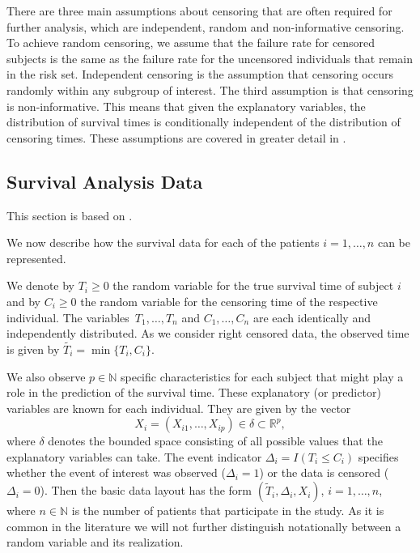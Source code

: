 \documentclass[12pt, a4paper]{scrartcl}
\theoremstyle{definition}
\theoremstyle{plain}
\numberwithin{equation}{section}
\numberwithin{figure}{section}
\numberwithin{table}{section}
\begin{document}
	There are three main assumptions about censoring that are often required for further analysis, which are independent, random and non-informative censoring.
	To achieve random censoring, we assume that the failure rate for censored subjects is the same as the failure rate for the uncensored individuals that remain in the risk set.
	Independent censoring is the assumption that censoring occurs randomly within any subgroup of interest.
	The third assumption is that censoring is non-informative.
	This means that given the explanatory variables, the distribution of survival times is conditionally independent of the distribution of censoring times.
	These assumptions are covered in greater detail in \citet*{bookfailuretime}.
	
	
	\subsection{Survival Analysis Data} \label{sabasics}
	
	This section is based on \citet*{sabook}.
	
	We now describe how the survival data for each of the patients $i = 1, \dots, n$ can be represented.
	
	We denote by $T_i \geq 0$ the random variable for the true survival time of subject $i$ and by $C_i \geq 0$ the random variable for the censoring time of the respective individual.
	The variables~$T_1,\dots,T_n$ and $C_1,\dots,C_n$ are each identically and independently distributed.
	As we consider right censored data, the observed time is given by $\tilde{T_i} = \min\{T_i,C_i\}$.
	
	We also observe $p\in \mathbb{N}$ specific characteristics for each subject that might play a role in the prediction of the survival time.
	These explanatory (or predictor) variables are known for each individual.
	They are given by the vector $$X_i = (X_{i1}, \dots , X_{ip}) \in \delta \subset \mathbb{R}^p,$$ where $\delta$ denotes the bounded space consisting of all possible values that the explanatory variables can take.
	The event indicator $\Delta_i = I(T_i \leq C_i)$ specifies whether the event of interest was observed ($\Delta_i=1$) or the data is censored ($\Delta_i=0$).
	Then the basic data layout has the form $(\tilde{T}_i, \Delta_i, X_i)$, $i = 1, \dots , n$, where $n \in \mathbb{N}$ is the number of patients that participate in the study.
	As it is common in the literature we will not further distinguish notationally between a random variable and its realization.
	
\end{document}
